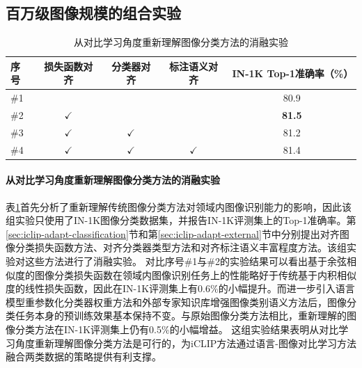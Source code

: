 \subsection{百万级图像规模的组合实验}
\begin{table}
  \centering
\caption{从对比学习角度重新理解图像分类方法的消融实验}
  \begin{tabular}{lcccc}
    \toprule
    序号 & 损失函数对齐 & 分类器对齐 & 标注语义对齐 & IN-1K Top-1准确率（\%） \\
    \midrule
    \#1 & & & & 80.9  \\
    \#2 & $\checkmark$ & & & \textbf{81.5} \\
    \#3 & $\checkmark$ & $\checkmark$ & & 81.2  \\
    \#4 & $\checkmark$ & $\checkmark$ & $\checkmark$ & 81.4 \\
    \bottomrule
  \end{tabular}
  \label{tab:iclip-ablate_head}
\end{table}

\paragraph{从对比学习角度重新理解图像分类方法的消融实验}
表\ref{tab:iclip-ablate_head}首先分析了重新理解传统图像分类方法对领域内图像识别能力的影响，因此该组实验只使用了IN-1K图像分类数据集，并报告IN-1K评测集上的Top-1准确率。第\ref{sec:iclip-adapt-classification}节和第\ref{sec:iclip-adapt-external}节中分别提出对齐图像分类损失函数方法、对齐分类器类型方法和对齐标注语义丰富程度方法。该组实验对这些方法进行了消融实验。%
对比序号\#1与\#2的实验结果可以看出基于余弦相似度的图像分类损失函数在领域内图像识别任务上的性能略好于传统基于内积相似度的线性损失函数，因此在IN-1K评测集上有0.6\%的小幅提升。而进一步引入语言模型重参数化分类器权重方法和外部专家知识库增强图像类别语义方法后，图像分类任务本身的预训练效果基本保持不变。与原始图像分类方法相比，重新理解的图像分类方法在IN-1K评测集上仍有0.5\%的小幅增益。
这组实验结果表明从对比学习角度重新理解图像分类方法是可行的，为iCLIP方法通过语言-图像对比学习方法融合两类数据的策略提供有利支撑。

